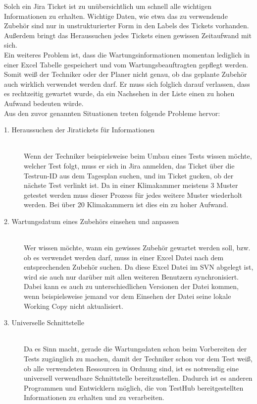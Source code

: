 Solch ein \gls{Jira} Ticket ist zu unübersichtlich um schnell alle wichtigen 
Informationen zu erhalten. Wichtige Daten, wie etwa das zu verwendende Zubehör
sind nur in unstrukturierter Form in den Labels des Tickets vorhanden. 
Außerdem bringt das Heraussuchen jedes Tickets einen gewissen Zeitaufwand mit sich.\\

Ein weiteres Problem ist, dass die Wartungsinformationen momentan lediglich in einer Excel
Tabelle gespeichert und vom Wartungsbeauftragten gepflegt werden. Somit
weiß der \gls{Techniker} oder der \gls{Planer} nicht genau, ob das geplante 
Zubehör auch wirklich verwendet werden darf. Er muss sich folglich darauf verlassen, 
dass es rechtzeitig gewartet wurde, da ein Nachsehen in der Liste einen zu hohen
Aufwand bedeuten würde.\\

\pagebreak
Aus den zuvor genannten Situationen treten folgende Probleme hervor:

\begin{description}

    \item[1. Heraussuchen der Jiratickets für Informationen]\hfill \\
    Wenn der Techniker beispielsweise beim Umbau eines Tests wissen möchte,
    welcher Test folgt, muss er sich in \gls{Jira} anmelden, das Ticket über die
    Testrun-ID aus dem Tagesplan suchen, und im Ticket gucken, ob der nächste 
    Test verlinkt ist. Da in einer Klimakammer meistens 3 Muster getestet werden
    muss dieser Prozess für jedes weitere Muster wiederholt werden. Bei über 20 
    Klimakammern ist dies ein zu hoher Aufwand.
    

    \item[2. Wartungsdatum eines Zubehörs einsehen und anpassen]\hfill \\
    Wer wissen möchte, wann ein gewisses Zubehör gewartet werden soll, bzw. ob 
    es verwendet werden darf, muss in einer Excel Datei nach dem entsprechenden
    Zubehör suchen. Da diese Excel Datei im \gls{SVN} abgelegt ist, wird sie auch nur
    darüber mit allen weiteren Benutzern synchronisiert. Dabei kann es auch zu 
    unterschiedlichen Versionen der Datei kommen, wenn beispielsweise jemand 
    vor dem Einsehen der Datei seine lokale Working Copy nicht aktualisiert.

    \item[3. Universelle Schnittstelle]\hfill \\
    Da es Sinn macht, gerade die Wartungsdaten schon beim Vorbereiten der Tests
    zugänglich zu machen, damit der \gls{Techniker} schon vor dem Test weiß,
    ob alle verwendeten Ressourcen in Ordnung sind, ist es notwendig eine universell
    verwendbare Schnittstelle bereitzustellen. Dadurch ist es anderen Programmen 
    und Entwicklern möglich, die von TestHub bereitgestellten Informationen zu 
    erhalten und zu verarbeiten.
\end{description}


